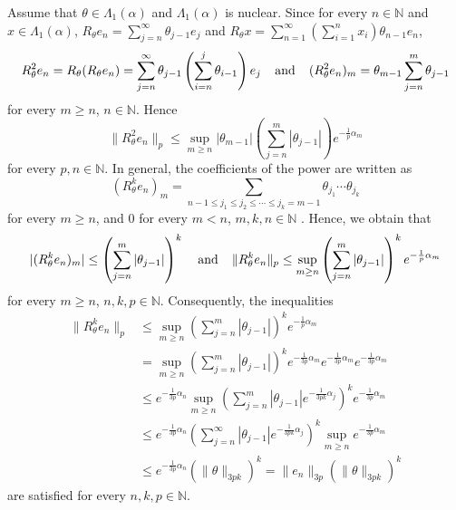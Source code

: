 \documentclass{birkjour}
\theoremstyle{definition}
\theoremstyle{remark}
\numberwithin{equation}{section}
\begin{document}
Assume that $\theta\in \Lambda_{1}(\alpha)$ and $\Lambda_{1}(\alpha)$ is nuclear. Since for every $n\in \mathbb{N}$ and $x\in \Lambda_{1}(\alpha)$, $\displaystyle R_{\theta}e_{n}=\sum^{\infty}_{j=n} \theta_{j-1}e_{j}$ and $\displaystyle R_{\theta}x=\sum^{\infty}_{n=1} \left(\sum^{n}_{i=1} x_{i}\right)\theta_{n-1} e_{n}$,
$$R^{2}_{\theta}e_{n}=R_{\theta}(R_{\theta}e_{n})=\sum^{\infty}_{j=n} \theta_{j-1}\left(\sum^{j}_{i=n}\theta_{i-1}\right)e_{j} \hspace{0.15in} \text{and}\hspace{0.15in}(R^{2}_{\theta}e_{n})_m=\theta_{m-1}\sum^{m}_{j=n}\theta_{j-1}$$
for every $m\geq n$, $n\in \mathbb{N}$. Hence
$$\|R^{2}_{\theta}e_{n}\|_{p}\leq \sup_{m\geq n}|\theta_{m-1}|\left(\sum^{m}_{j=n}|\theta_{j-1}|\right)e^{-\frac{1}{p}\alpha_{m}}$$
for every $p,n\in \mathbb{N}$. In general, the coefficients of the power are written as
$$(R^{k}_{\theta}e_{n})_{m}=\sum_{n-1\leq j_{1}\leq j_{2}\leq \cdots\leq j_{k}=m-1}\theta_{j_{1}}\cdots \theta_{j_{k}}$$
for every $m\geq n$, and 0 for every $m<n$, $m,k,n\in \mathbb{N}$ . Hence, we obtain that
$$|(R^{k}_{\theta}e_{n})_{m}|\leq\left( \sum^{m}_{j=n}|\theta_{j-1}|\right)^{k}\hspace{0.15in}\text{and}\hspace{0.15in}
\|R^{k}_{\theta}e_{n}\|_{p}\leq \sup_{m\geq n}\left(\sum^{m}_{j=n}|\theta_{j-1}|\right)^{k}e^{-\frac{1}{p}\alpha_{m}}$$
for every $m\geq n$, $n,k,p\in \mathbb{N}$. Consequently, the inequalities 
\begin{equation} \label{Fesas}
\begin{split}
\|R^{k}_{\theta}e_{n}\|_{p}&\leq \sup_{m\geq n}\left(\sum^{m}_{j=n}|\theta_{j-1}|\right)^{k}e^{-\frac{1}{p}\alpha_{m}} \\
&=\sup_{m\geq n}\left(\sum^{m}_{j=n}|\theta_{j-1}|\right)^{k}e^{-\frac{1}{3p}\alpha_{m}}e^{-\frac{1}{3p}\alpha_{m}}e^{-\frac{1}{3p}\alpha_{m}} \\
&\leq e^{-\frac{1}{3p}\alpha_{n}} \sup_{m\geq n} \left(\sum^{m}_{j=n} |\theta_{j-1}|e^{-\frac{1}{3pk}\alpha_{j}}\right)^{k} e^{-\frac{1}{3p}\alpha_{m}} \\
& \leq e^{-\frac{1}{3p}\alpha_{n}}  \left(\sum^{\infty}_{j=n} |\theta_{j-1}|e^{-\frac{1}
{3pk}\alpha_{j}}\right)^{k} \sup_{m\geq n} e^{-\frac{1}{3p}\alpha_{m}} \\
&\leq e^{-\frac{1}{3p}\alpha_{n}} \left(\|\theta\|_{3pk}\right)^{k} =\|e_{n}\|_{3p} \left(\|\theta\|_{3pk}\right)^{k}
\end{split}
\end{equation}
are satisfied for every $n,k,p\in \mathbb{N}$.
\end{document}
